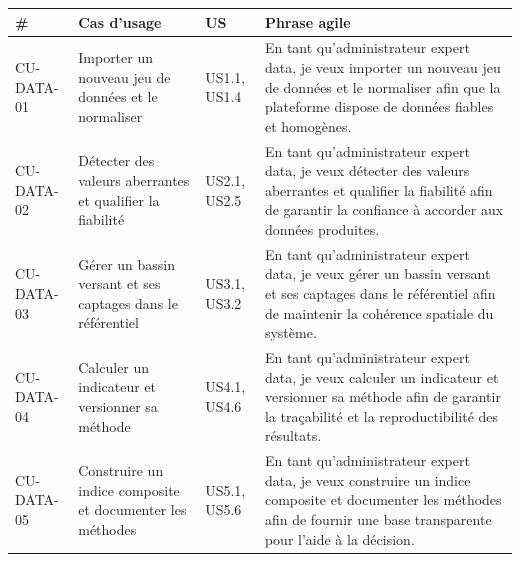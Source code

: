\documentclass[
  paper=a4,
  oneside  ,captions=tableheading
]{scrartcl}
\begin{document}
{\def\LTcaptype{none} %
\begin{longtable}[]{@{}
  >{\raggedright\arraybackslash}p{}
  >{\raggedright\arraybackslash}p{}
  >{\raggedright\arraybackslash}p{}
  >{\raggedright\arraybackslash}p{}@{}}
\toprule\noalign{}
\begin{minipage}[b]{\linewidth}\raggedright
\#
\end{minipage} & \begin{minipage}[b]{\linewidth}\raggedright
Cas d'usage
\end{minipage} & \begin{minipage}[b]{\linewidth}\raggedright
US
\end{minipage} & \begin{minipage}[b]{\linewidth}\raggedright
Phrase agile
\end{minipage} \\
\midrule\noalign{}
\endhead
\bottomrule\noalign{}
\endlastfoot
CU-DATA-01 & Importer un nouveau jeu de données et le normaliser &
US1.1, US1.4 & En tant qu'administrateur expert data, je veux importer
un nouveau jeu de données et le normaliser afin que la plateforme
dispose de données fiables et homogènes. \\
CU-DATA-02 & Détecter des valeurs aberrantes et qualifier la fiabilité &
US2.1, US2.5 & En tant qu'administrateur expert data, je veux détecter
des valeurs aberrantes et qualifier la fiabilité afin de garantir la
confiance à accorder aux données produites. \\
CU-DATA-03 & Gérer un bassin versant et ses captages dans le référentiel
& US3.1, US3.2 & En tant qu'administrateur expert data, je veux gérer un
bassin versant et ses captages dans le référentiel afin de maintenir la
cohérence spatiale du système. \\
CU-DATA-04 & Calculer un indicateur et versionner sa méthode & US4.1,
US4.6 & En tant qu'administrateur expert data, je veux calculer un
indicateur et versionner sa méthode afin de garantir la traçabilité et
la reproductibilité des résultats. \\
CU-DATA-05 & Construire un indice composite et documenter les méthodes &
US5.1, US5.6 & En tant qu'administrateur expert data, je veux construire
un indice composite et documenter les méthodes afin de fournir une base
transparente pour l'aide à la décision. \\
\end{longtable}
}
\end{document}
